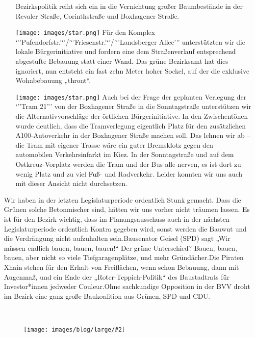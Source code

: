 \documentclass[a4paper,10pt]{article}
\newcommand{\mysection}[1]{{\vspace{1cm}\noindent\color{gray}{\ttfamily\LARGE\raggedright #1}\\\medskip}}
\newcommand{\abschnitt}[2]{%
\mysection{\raggedright #1}%
\begin{figure}[t]%
\vspace*{-2.7cm}%
\hspace*{-2.1cm}%
\texttt{[image: images/blog/large/\#2]} %
\end{figure}%
}
\newcommand{\flachmann}[1]{
\begin{figure}[b!]
\\
\parbox{5cm}{
\hspace*{-7cm}%
\vspace*{1cm}%
\texttt{[image: ./images/blog/large/\#1]}
}
\end{figure}
}
\begin{document}
\begin{itemize}
  Bezirkspolitik reiht sich ein in die Vernichtung großer Baumbestände
  in der Revaler Straße, Corinthstraße und Boxhagener Straße.
\item[\texttt{[image: images/star.png]}]
  Für den Komplex `''Pufendorfstr.'`'/'`'Friesenstr.'`'/'`'Landsberger
  Allee''' unterstützten wir die lokale Bürgerinitiative und fordern
  eine dem Straßenverlauf entsprechend abgestufte Bebauung statt einer
  Wand. Das grüne Bezirksamt hat dies ignoriert, nun entsteht ein fast
  zehn Meter hoher Sockel, auf der die exklusive Wohnbebauung „thront``.
\item[\texttt{[image: images/star.png]}]
  Auch bei der Frage der geplanten Verlegung der `''Tram 21''' von der
  Boxhagener Straße in die Sonntagstraße unterstützen wir die
  Alternativvorschläge der örtlichen Bürgerinitiative. In den
  Zwischentönen wurde deutlich, dass die Tramverlegung eigentlich Platz
  für den zusätzlichen A100-Autoverkehr in der Boxhagener Straße machen
  soll. Das lehnen wir ab -- die Tram mit eigener Trasse wäre ein guter
  Bremsklotz gegen den automobilen Verkehrsinfarkt im Kiez. In der
  Sonntagstraße und auf dem Ostkreuz-Vorplatz werden die Tram und der
  Bus alle nerven, es ist dort zu wenig Platz und zu viel Fuß- und
  Radverkehr. Leider konnten wir uns auch mit dieser Ansicht nicht
  durchsetzen.
\end{itemize}

Wir haben in der letzten Legislaturperiode ordentlich Stunk gemacht.
Dass die Grünen solche Betonmischer sind, hätten wir uns vorher nicht
träumen lassen. Es ist für den Bezirk wichtig, dass im Planungsausschuss
auch in der nächsten Legislaturperiode ordentlich Kontra gegeben wird,
sonst werden die Bauwut und die Verdrängung nicht aufzuhalten
sein.Bausenator Geisel (SPD) sagt „Wir müssen endlich bauen, bauen,
bauen!`` Der grüne Unterschied? Bauen, bauen, bauen, aber nicht so viele
Tiefgaragenplätze, und mehr Gründächer.Die Piraten Xhain stehen für den
Erhalt von Freiflächen, wenn schon Bebauung, dann mit Augenmaß, und ein
Ende der „Roter-Teppich-Politik`` des Baustadtrats für Investor*innen
jedweder Couleur.Ohne sachkundige Opposition in der BVV droht im Bezirk
eine ganz große Baukoalition aus Grünen, SPD und CDU.


\clearpage
\abschnitt{Wohnen und Mieten}{GefahrengebietMiete.png}
\end{document}
